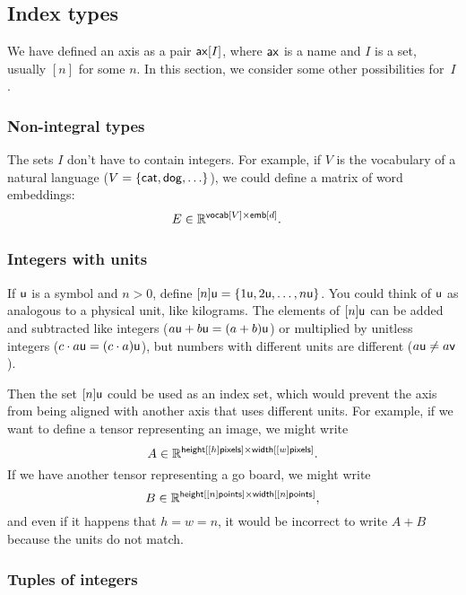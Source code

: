 \subsection{Index types}

We have defined an axis as a pair $\mathsf{ax}[I]$, where $\mathsf{ax}$ is a name and $I$ is a set, usually $[n]$ for some $n$. In this section, we consider some other possibilities for~$I$.

\subsubsection{Non-integral types}

The sets $I$ don't have to contain integers. For example, if $V$ is the vocabulary of a natural language ($V = \{ \mathsf{cat}, \mathsf{dog}, \ldots \}$), we could define a matrix of word embeddings:
\begin{align*}
  E &\in \mathbb{R}^{\mathsf{vocab}[V] \times \mathsf{emb}[d]}.
\end{align*}

\subsubsection{Integers with units}

If $\mathsf{u}$ is a symbol and $n > 0$, define $[n]\mathsf{u} = \{1\mathsf{u}, 2\mathsf{u}, \ldots, n\mathsf{u}\}$. You could think of $\mathsf{u}$ as analogous to a physical unit, like kilograms. The elements of $[n]\mathsf{u}$ can be added and subtracted like integers ($a\mathsf{u} + b\mathsf{u} = (a+b)\mathsf{u}$) or multiplied by unitless integers ($c \cdot a\mathsf{u} = (c \cdot a) \mathsf{u}$), but numbers with different units are different ($a \mathsf{u} \neq a \mathsf{v}$).

Then the set $[n]\mathsf{u}$ could be used as an index set, which would prevent the axis from being aligned with another axis that uses different units. For example, if we want to define a tensor representing an image, we might write
\[ A \in \mathbb{R}^{\mathsf{height}[[h]\mathsf{pixels}] \times \mathsf{width}[[w]\mathsf{pixels}]}. \]
If we have another tensor representing a go board, we might write
\[ B \in \mathbb{R}^{\mathsf{height}[[n]\mathsf{points}] \times \mathsf{width}[[n]\mathsf{points}]}, \]
and even if it happens that $h = w = n$, it would be incorrect to write $A+B$ because the units do not match.

\subsubsection{Tuples of integers}

